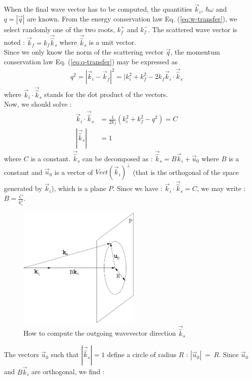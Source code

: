 When the final wave vector has to be computed, the quantities $\vec{k}_i$, $\hbar \omega$ and $q = |\vec{q}|$ are known.
From the energy conservation law Eq. (\ref{eq:w-transfer}), we select randomly one of the two roots, $k_f^+$ and $k_f^-$.
The scattered wave vector is noted : $\vec{k}_f = k_f \vec{\hat k}_s$ where $\vec{\hat k}_s$ is a unit vector.\\
Since we only know the norm of the scattering vector $\vec{q}$, the momentum conservation law Eq. (\ref{eq:q-transfer}) may be expressed as
\begin{align}
q^2 = |\vec{k}_i -\vec{k}_f|^2 = |k_i^2 + k_f^2 - 2 k_f \vec{k}_i \cdot \vec{\hat k}_s
\end{align}
where $\vec{k}_i \cdot \vec{\hat k}_s$ stands for the dot product of the vectors.\\
Now, we should solve :
\begin{align}
\vec{k}_i \cdot \vec{\hat k}_s &= \frac{1}{2k_f} (k_i^2 + k_f^2 - q^2) = C \\
|\vec{\hat k}_s| &= 1
\end{align}
where $C$ is a constant.
$\vec{\hat k}_s$ can be decomposed as : $\vec{\hat k}_s = B \vec{k}_i + \vec{u}_0$ where $B$ is a constant and $\vec{u}_0$ is a vector of $Vect(\vec{k}_i)^{\bot}$ (that is the orthogonal of the space generated by $\vec{k}_i$), which is a plane $P$.
Since we have : $\vec{k}_i \cdot \vec{\hat k}_s = C$, we may write : $B = \frac{C}{k_i^2}$.
\begin{figure}[!h]
\begin{center}
\includegraphics*[height=6cm]{figures/calckf_2.eps}
\caption{How to compute the outgoing wavevector direction $\vec{\hat k}_s$}
\label{fig:ann_kf}
\end{center}
\end{figure}
The vectors $\vec{u}_0$ such that $|\vec{\hat k}_s| = 1$ define a circle of radius $R$ : $|\vec{u}_0|~=~R$.
Since $\vec{u}_0$ and $B \vec{k}_i$ are orthogonal, we find :

